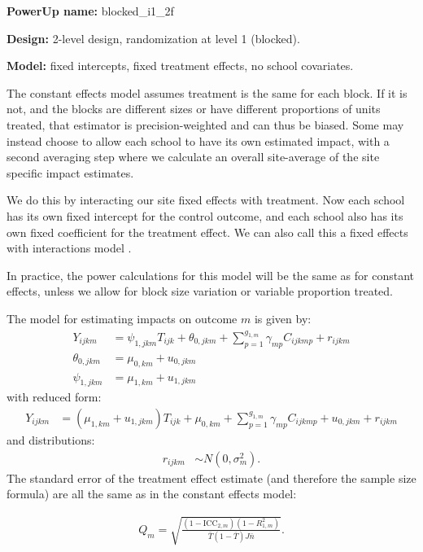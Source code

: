 \documentclass[12pt]{article}
\begin{document}
\textbf{PowerUp name:} blocked\_i1\_2f

\textbf{Design:} 2-level design, randomization at level 1 (blocked).

\textbf{Model:} fixed intercepts, fixed treatment effects, no school covariates.

The constant effects model assumes treatment is the same for each block.
If it is not, and the blocks are different sizes or have different proportions of units treated, that estimator is precision-weighted and can thus be biased.
Some may instead choose to allow each school to have its own estimated impact, with a second averaging step where we calculate an overall site-average of the site specific impact estimates.

We do this by interacting our site fixed effects with treatment.
Now each school has its own fixed intercept for the control outcome, and each school also has its own fixed coefficient for the treatment effect.
We can also call this a fixed effects with interactions model \citep{Miratrix2020}.

In practice, the power calculations for this model will be the same as for constant effects, unless we allow for block size variation or variable proportion treated.

The model for estimating impacts on outcome $m$ is given by:
\begin{align}
Y_{ijkm} &= \psi_{1,jkm} T_{ijk} + \theta_{0,jkm} + \sum_{p=1}^{g_{1,m}} \gamma_{mp} C_{ijkmp} + r_{ijkm}\\
\nonumber \theta_{0,jkm} &= \mu_{0,km} + u_{0,jkm}\\
\nonumber \psi_{1,jkm} &= \mu_{1,km} + u_{1,jkm}
\end{align}
with reduced form:
\begin{align}
Y_{ijkm} &= \left(\mu_{1,km} + u_{1,jkm}\right) T_{ijk} + \mu_{0,km} + \sum_{p=1}^{g_{1,m}} \gamma_{mp} C_{ijkmp} + u_{0,jkm} + r_{ijkm}
\end{align}
and distributions:
\begin{align}
r_{ijkm} &\sim N\left(0, \sigma^2_m\right).
\end{align}
The standard error of the treatment effect estimate (and therefore the sample size formula) are all the same as in the constant effects model:

\begin{align} Q_m = \sqrt{\frac{(1-\text{ICC}_{2,m})(1-R^2_{1,m})}{\bar{T}(1 - \bar{T}) J \bar{n}}} . \end{align}
\end{document}
